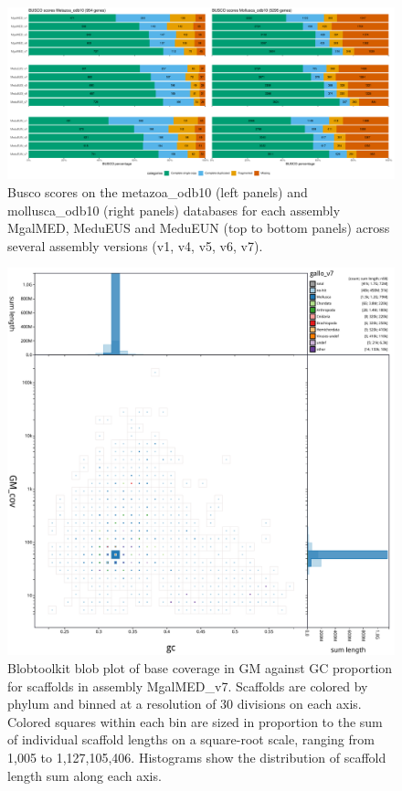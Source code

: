 \documentclass[11pt, a4paper]{article}
\begin{document}
\begin{figure}[h]
	\includegraphics[width=\linewidth]{figures/supfig_busco.pdf}
	\caption{Busco scores on the metazoa\_odb10 (left panels) and mollusca\_odb10 (right panels) databases for each assembly MgalMED, MeduEUS and MeduEUN (top to bottom panels) across several assembly versions (v1, v4, v5, v6, v7).}
	\label{supfig:busco}
\end{figure}

\begin{figure}
	\includegraphics[width=\linewidth]{figures/btk_blob_MgalMED_v7}
	\caption{Blobtoolkit blob plot of base coverage in GM against GC proportion for scaffolds in assembly MgalMED\_v7. Scaffolds are colored by phylum and binned at a resolution of 30 divisions on each axis. Colored squares within each bin are sized in proportion to the sum of individual scaffold lengths on a square-root scale, ranging from 1,005 to 1,127,105,406. Histograms show the distribution of scaffold length sum along each axis.}
	\label{supfig:btk-blob-MgalMED}
\end{figure}
\end{document}
